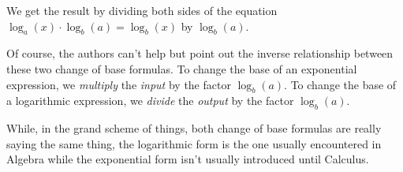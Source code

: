 \documentclass{ximera}
\begin{document}
 We get the result by dividing both sides of the equation $\log_{a}(x) \cdot \log_{b}(a)  =  \log_{b}(x)$ by  $\log_{b}(a)$.  
 
 
 Of course, the authors can't help but point out the inverse relationship between these two change of base formulas.  To change the base of an exponential expression, we \textit{multiply} the \textit{input} by the factor $\log_{b}(a)$.  To change the base of a logarithmic expression, we \textit{divide} the \textit{output} by the factor $\log_{b}(a)$.  
 
 
 While, in the grand scheme of things, both change of base formulas are really saying the same thing, the logarithmic form is the one usually encountered in Algebra while the exponential form isn't usually introduced until Calculus.
\end{document}
